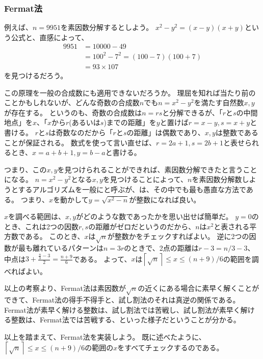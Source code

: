 \subsubsection{Fermat法}
例えば、$n=9951$を素因数分解するとしよう。
$x^2-y^2 = (x-y)(x+y)$という公式と、直感によって、
\begin{align*}
9951 &= 10000 - 49\\
&= 100^2 - 7^2 = (100 - 7)(100 + 7)\\
&= 93 \times 107
\end{align*}
を見つけるだろう。

この原理を一般の合成数にも適用できないだろうか。
理屈を知れば当たり前のことかもしれないが、どんな奇数の合成数$n$でも$n=x^2-y^2$を満たす自然数$x,y$が存在する。
というのも、奇数の合成数は$n=rs$と分解できるが、「$r$と$s$の中間地点」を$x$、「$x$から$r$(あるいは$s$)までの距離」を$y$と置けば$r=x-y,s=x+y$と書ける。
$r$と$s$は奇数なのだから「$r$と$s$の距離」は偶数であり、$x,y$は整数であることが保証される。
数式を使って言い直せば、$r=2a+1,s=2b+1$と表せられるとき、$x=a+b+1,y=b-a$と書ける。

つまり、この$x,y$を見つけられることができれば、素因数分解できたと言うことになる。
$n=x^2-y^2$となる$x,y$を見つけることによって、$n$を素因数分解数しようとするアルゴリズムを一般にと呼ぶが、は、その中でも最も愚直な方法である。
つまり、$x$を動かして$y=\sqrt{x^2-n}$が整数になれば良い。

$x$を調べる範囲は、$x,y$がどのような数であったかを思い出せば簡単だ。
$y=0$のとき、これは2つの因数$r,s$の距離がゼロだというのだから、$n$は$x^2$と表される平方数である。
このとき、$x$は$\sqrt{n}$が整数かをチェックすればよい。
逆に2つの因数が最も離れているパターンは$n=3r$のときで、2点の距離は$r-3=n/3-3$、中点は$3+\frac{\frac{n}{3}-3}{2}=\frac{n+9}{6}$である。
よって、$x$は$\left \lceil\sqrt{n}\right \rceil\le x \le (n + 9) / 6$の範囲を調べればよい。

以上の考察より、Fermat法は素因数が$\sqrt{n}$の近くにある場合に素早く解くことができて、Fermat法の得手不得手と、試し割法のそれは真逆の関係である。
Fermat法が素早く解ける整数は、試し割法では苦戦し、試し割法が素早く解ける整数は、Fermat法では苦戦する、といった様子だということが分かる。

以上を踏まえて、Fermat法を実装しよう。
既に述べたように、$\left \lceil\sqrt{n}\right \rceil \le x \le (n + 9) / 6$の範囲の$x$をすべてチェックするのである。


